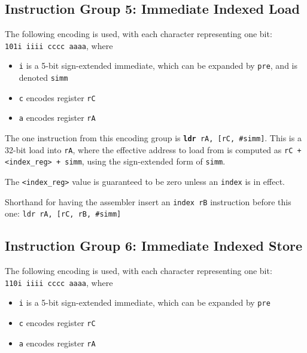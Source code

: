 \documentclass{article}
\begin{document}
	\doublespacing
	\subsection{Instruction Group 5:  Immediate Indexed Load}
	The following encoding is used, with each character representing one
	bit:  \\
	\texttt{101i iiii cccc aaaa}, where

	\singlespacing
	\begin{itemize}
		\item \texttt{i} is a 5-bit sign-extended immediate, which can
		be expanded by \texttt{pre}, and is denoted \texttt{simm}
		\item \texttt{c} encodes register \texttt{rC}
		\item \texttt{a} encodes register \texttt{rA}
	\end{itemize}
	\doublespacing

	The one instruction from this encoding group is
	\texttt{\textbf{ldr} rA, [rC, \#simm]}.
	This is a 32-bit load into \texttt{rA}, where the effective address to
	load from is computed as \texttt{rC + <index\_reg> + simm}, using the
	sign-extended form of \texttt{simm}.

	The \texttt{<index\_reg>} value is guaranteed to be zero unless an
	\texttt{index} is in effect.

	Shorthand for having the assembler insert an \texttt{index rB}
	instruction before this one: \texttt{ldr rA, [rC, rB, \#simm]}


	\subsection{Instruction Group 6:  Immediate Indexed Store}
	The following encoding is used, with each character representing one
	bit:  \\
	\texttt{110i iiii cccc aaaa}, where

	\singlespacing
	\begin{itemize}
		\item \texttt{i} is a 5-bit sign-extended immediate, which can
		be expanded by \texttt{pre}  
		\item \texttt{c} encodes register \texttt{rC}
		\item \texttt{a} encodes register \texttt{rA}
	\end{itemize}
	\doublespacing
\end{document}
